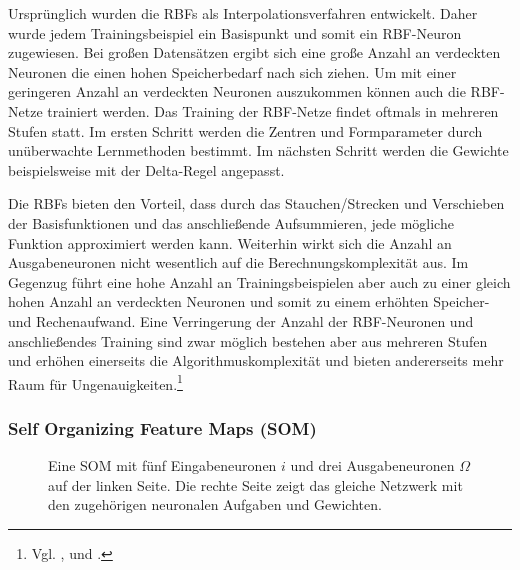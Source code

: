 Ursprünglich wurden die RBFs als Interpolationsverfahren entwickelt. Daher wurde jedem Trainingsbeispiel ein Basispunkt und somit ein RBF-Neuron zugewiesen. Bei großen Datensätzen ergibt sich eine große Anzahl an verdeckten Neuronen die einen hohen Speicherbedarf nach sich ziehen. Um mit einer geringeren Anzahl an verdeckten Neuronen auszukommen können auch die RBF-Netze trainiert werden. Das Training der RBF-Netze findet oftmals in mehreren Stufen statt. Im ersten Schritt werden die Zentren und Formparameter durch unüberwachte Lernmethoden bestimmt. Im nächsten Schritt werden die Gewichte beispielsweise mit der Delta-Regel angepasst.

Die RBFs bieten den Vorteil, dass durch das Stauchen/Strecken und Verschieben der Basisfunktionen und das anschließende Aufsummieren, jede mögliche Funktion approximiert werden kann. Weiterhin wirkt sich die Anzahl an Ausgabeneuronen nicht wesentlich auf die Berechnungskomplexität aus. Im Gegenzug führt eine hohe Anzahl an Trainingsbeispielen aber auch zu einer gleich hohen Anzahl an verdeckten Neuronen und somit zu einem erhöhten Speicher- und Rechenaufwand. Eine Verringerung der Anzahl der RBF-Neuronen und anschließendes Training sind zwar möglich bestehen aber aus mehreren Stufen und erhöhen einerseits die Algorithmuskomplexität und bieten andererseits mehr Raum für Ungenauigkeiten.\footnote{Vgl. \citet[73 ff]{comp_int_07}, \citet[109 ff]{dkriesel07} und \citet[261 ff]{Kroll16}.}



\subsubsection{Self Organizing Feature Maps (SOM)}
\begin{figure}[!htb]
    \centering
        
    \caption[Darstellung eines SOM]{Eine SOM mit fünf Eingabeneuronen $i$ und drei Ausgabeneuronen $\Omega$ auf der linken Seite. Die rechte Seite zeigt das gleiche Netzwerk mit den zugehörigen neuronalen Aufgaben und Gewichten.}
    \label{fig:SOM}
\end{figure}

